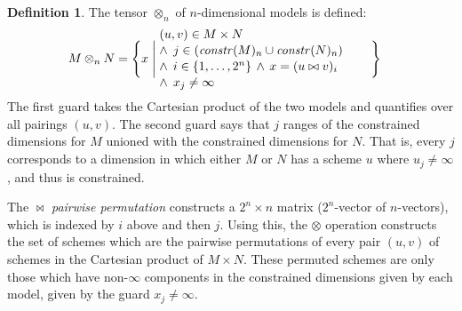 \documentclass[9pt]{sigplanconf}
\newcounter{block}
\theoremstyle{definition}
\newtheorem{definition}[block]{Definition}
\newcommand{\effdims}[2]{\mathit{constr}(#1)_{#2}}
\begin{document}
\begin{definition}The tensor $\otimes_n$ of $n$-dimensional
models is defined:
\begin{alignat*}{2}
& M \otimes_n N =
  \Bigg\{x \; \Bigg| \;
    \parbox{6cm}{$(u, v) \in M \times N $ \\[0.1em]
                 $\;\; \wedge \;\, j \in (\effdims{M}{n} \cup
                   \effdims{N}{n})$\\[0.1em]
                  $\;\; \wedge \;\, i \in \{1, \ldots, 2^n\} \, \wedge
                  \, x = (u \bowtie v)_i$ \\[0.1em]                   
                   $\;\; \wedge \;\, x_j \neq \infty$
                  } \Bigg\} 
\end{alignat*}
The first guard takes the Cartesian product of
the two models and quantifies over all pairings $(u, v)$. 
The second guard says that $j$ ranges of the constrained
dimensions for $M$ unioned with the constrained dimensions for $N$.
That is, every $j$ corresponds to a dimension in which 
either $M$ or $N$ has a scheme $u$ where $u_j \neq \infty$,
and thus is constrained. 

The $\bowtie$ \emph{pairwise permutation} 
constructs a $2^n \times n$ matrix ($2^n$-vector of
$n$-vectors), which is indexed by $i$ above
and then $j$. Using this, the $\otimes$ operation constructs the set
of schemes which are the 
pairwise permutations of every pair $(u, v)$ of schemes in the Cartesian
product of $M \times N$. These permuted schemes are only those
which have non-$\infty$ components in the constrained dimensions
given by each model, given by the guard $x_j \neq \infty$.


\end{definition}
\end{document}
